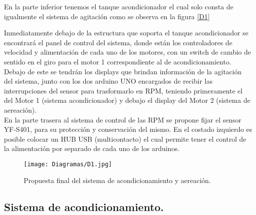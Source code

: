 \documentclass[11pt,letter
								]
								{article}
\begin{document}
En la parte inferior tenemos el tanque acondicionador el cual solo consta de igualmente el sistema de agitación como se observa en la figura \ref{D1}%

Inmediatamente debajo de la estructura que soporta el  tanque acondicionador se encontrará el panel de control del sistema, donde están  los controladores de velocidad y alimentación de cada uno de los motores, con un switch de cambio de sentido en el giro  para el motor 1 correspondiente al  de acondicionamiento.\\

Debajo de este se tendrán los displays que brindan información de la agitación del sistema, junto con los dos arduino UNO encargados de recibir las interrupciones del sensor para trasformarlo en RPM, teniendo primeramente el del Motor 1 (sistema acondicionador) y debajo el display del Motor 2 (sistema de aereación).\\

En la parte trasera al sistema de control de las RPM se propone fijar  el sensor YF-S401, para su protección y conservación del mismo. En el costado izquierdo es posible colocar  un HUB USB (multicontacto) el cual permite tener el control de la alimentación  por separado de cada uno de los arduinos.\\



\begin{figure}[H]
\centering
\texttt{[image: Diagramas/D1.jpg]}
\caption{Propuesta  final del sistema de acondicionamiento y aereación.  }
\label{D2}
\end{figure}






		\subsection{Sistema de acondicionamiento. }
\end{document}
